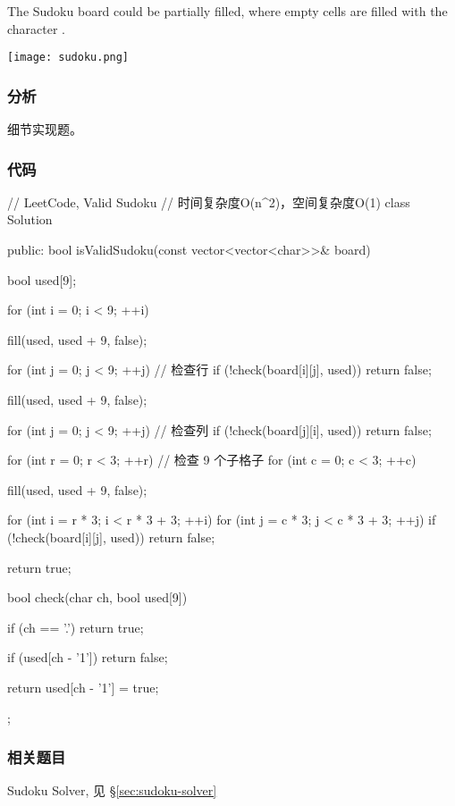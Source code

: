 The Sudoku board could be partially filled, where empty cells are filled with the character .

\begin{center}
\texttt{[image: sudoku.png]}\\
\label{fig:sudoku}
\end{center}

\subsubsection{分析}
细节实现题。


\subsubsection{代码}
\begin{Code}
// LeetCode, Valid Sudoku
// 时间复杂度O(n^2)，空间复杂度O(1)
class Solution {
public:
    bool isValidSudoku(const vector<vector<char>>& board) {
        bool used[9];

        for (int i = 0; i < 9; ++i) {
            fill(used, used + 9, false);

            for (int j = 0; j < 9; ++j) // 检查行
                if (!check(board[i][j], used))
                    return false;

            fill(used, used + 9, false);

            for (int j = 0; j < 9; ++j) // 检查列
                if (!check(board[j][i], used))
                    return false;
        }

        for (int r = 0; r < 3; ++r) // 检查 9 个子格子
            for (int c = 0; c < 3; ++c) {
                fill(used, used + 9, false);

                for (int i = r * 3; i < r * 3 + 3; ++i)
                    for (int j = c * 3; j < c * 3 + 3; ++j)
                        if (!check(board[i][j], used))
                            return false;
            }

        return true;
    }

    bool check(char ch, bool used[9]) {
        if (ch == '.') return true;

        if (used[ch - '1']) return false;

        return used[ch - '1'] = true;
    }
};
\end{Code}


\subsubsection{相关题目}
\begindot
\item Sudoku Solver, 见 \S \ref{sec:sudoku-solver}
\myenddot


